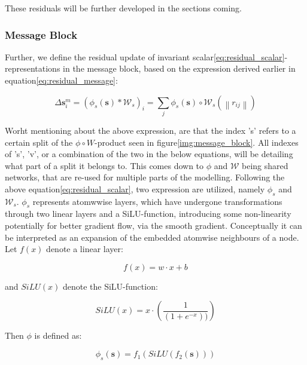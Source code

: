 These residuals will be further developed in the sections coming.


\subsubsection{Message Block}\label{subsubsec:message_block}

Further, we define the residual update of invariant scalar\ref{eq:residual_scalar}-representations in the message block,
based on the expression derived earlier in equation\ref{eq:residual_message}:

\begin{equation}\label{eq:residual_scalar}
    \Delta \mathbf{s}_{i}^{m}= (\phi_{s}(\mathbf{s}) * \mathcal{W}_{s})_{i} = \sum_{j} \phi_{s}(\mathbf{s}) \circ \mathcal{W}_{s} \left ( \left \| r_{ij} \right \| \right )
\end{equation}

Worht mentioning about the above expression, are that the index 's' refers to a certain split of the $\phi \circ W$-product seen
in figure\ref{img:message_block}. All indexes of 's', 'v', or a combination of the two in the below equations,
will be detailing what part of a split it belongs to. This comes down to $\phi$ and $\mathcal{W}$ being shared networks, that are re-used
for multiple parts of the modelling.
Following the above equation\ref{eq:residual_scalar}, two expression are utilized, namely $\phi_{s}$ and $\mathcal{W}_{s}$.
$\phi_{s}$ represents atomwwise layers, which have undergone transformations through two linear layers and a SiLU-function,
introducing some non-linearity potentially for better gradient flow, via the smooth gradient. Conceptually it can be interpreted as an
expansion of the embedded atomwise neighbours of a node.
Let $f(x)$ denote a linear layer:

\begin{equation}\label{eq:linear_layer}
    f(x) = w \cdot x + b
\end{equation}

and $SiLU(x)$ denote the SiLU-function:

\begin{equation}\label{eq:SiLU}
    SiLU(x) = x \cdot \left (  \frac{1}{(1+e^{-x}))}\right )
\end{equation}

Then $\phi$ is defined as:

\begin{equation}\label{eq:phi}
    \phi_{s}(\mathbf{s}) = f_{1}(SiLU(f_{2}(\mathbf{s})))
\end{equation}

